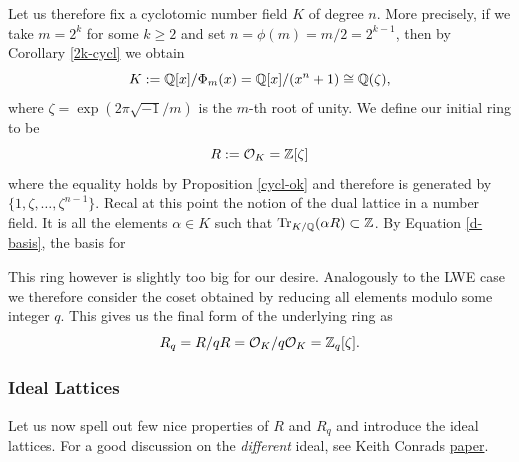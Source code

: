 Let us therefore fix a cyclotomic number field $K$ of degree $n$. More precisely, if we take $m = 2^k$ for some $k \geq 2$ and set $n = \phi(m) = m/2 = 2^{k-1}$, then by Corollary \ref{2k-cycl} we obtain
\[ K := \mathbb{Q}[x]/\Phi_m(x) = \mathbb{Q}[x]/(x^n + 1) \cong \mathbb{Q}(\zeta), \]
where $\zeta = \exp(2 \pi \sqrt{-1}/m)$ is the $m$-th root of unity. We define our initial ring to be
\begin{equation} R := \mathcal{O}_K = \mathbb{Z}[\zeta] \end{equation}
where the equality holds by Proposition \ref{cycl-ok} and therefore is generated by $\{1, \zeta, \dots, \zeta^{n-1} \}$. Recal at this point the notion of the dual lattice in a number field. It is all the elements $\alpha \in K$ such that $\Tr_{K/\mathbb{Q}}(\alpha R) \subset \mathbb{Z}$. By Equation \ref{d-basis}, the basis for 

This ring however is slightly too big for our desire. Analogously to the LWE case we therefore consider the coset obtained by reducing all elements modulo some integer $q$. This gives us the final form of the underlying ring as 
\begin{equation} R_q = R/qR = \mathcal{O}_K/q \mathcal{O}_K = \mathbb{Z}_q[\zeta]. \end{equation}
\subsubsection*{Ideal Lattices}
Let us now spell out few nice properties of $R$ and $R_q$ and introduce the ideal lattices. For a good discussion on the \textit{different} ideal, see Keith Conrads \href{https://kconrad.math.uconn.edu/blurbs/gradnumthy/different.pdf}{paper}.

